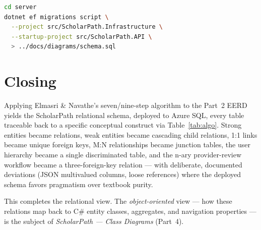 \documentclass[11pt,a4paper]{article}
\begin{document}
\begin{lstlisting}[language=bash]
cd server
dotnet ef migrations script \
  --project src/ScholarPath.Infrastructure \
  --startup-project src/ScholarPath.API \
  > ../docs/diagrams/schema.sql
\end{lstlisting}

\section{Closing}

Applying Elmasri \& Navathe's seven/nine-step algorithm to the Part~2 EERD
yields the ScholarPath relational schema, deployed to Azure SQL, every table
traceable back to a specific conceptual construct via Table~\ref{tab:algo}.
Strong entities became relations, weak entities became cascading child relations,
1:1 links became unique foreign keys, M:N relationships became junction tables,
the user hierarchy became a single discriminated table, and the n-ary
provider-review workflow became a three-foreign-key relation --- with deliberate,
documented deviations (JSON multivalued columns, loose references) where the
deployed schema favors pragmatism over textbook purity.

This completes the relational view. The \emph{object-oriented} view --- how
these relations map back to C\# entity classes, aggregates, and navigation
properties --- is the subject of \emph{ScholarPath --- Class Diagrams}
(Part~4).
\end{document}
